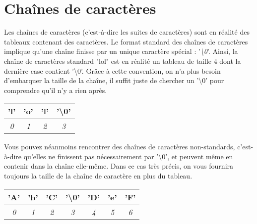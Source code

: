 \documentclass[11pt,a4paper]{article}
\begin{document}
\clearpage


\section{Chaînes de caractères}

Les chaînes de caractères (c'est-à-dire les suites de caractères) sont en réalité des tableaux contenant des caractères.
Le format standard des chaînes de caractères implique qu'une chaîne finisse par un unique caractère spécial : '\textit{\textbackslash 0}'.
Ainsi, la chaîne de caractères standard "lol" est en réalité un tableau de taille $ 4 $ dont la dernière case contient '\textbackslash 0'.
Grâce à cette convention, on n'a plus besoin d'embarquer la taille de la chaîne, il suffit juste de chercher un '\textbackslash 0' pour comprendre qu'il n'y a rien après.

\bigskip

\begin{table}[h!]
  \centering
  \begin{tabular}{| c | c | c | c |}
  \hline
'l' & 'o' & 'l' & '\textbackslash 0' \\
  \hline
\textit{0} & \textit{1} & \textit{2} & \textit{3} \\
  \hline
  \end{tabular}
\end{table}

\bigskip

Vous pouvez néanmoins rencontrer des chaînes de caractères non-standards, c'est-à-dire qu'elles ne finissent pas nécessairement par '\textbackslash 0', et peuvent même en contenir dans la chaîne elle-même.
Dans ce cas très précis, on vous fournira toujours la taille de la chaîne de caractère en plus du tableau.

\bigskip

\begin{table}[h!]
  \centering
  \begin{tabular}{| c | c | c | c | c | c | c |}
  \hline
'A' & 'b' & 'C' & '\textbackslash 0' & 'D' & 'e' & 'F' \\
  \hline
\textit{0} & \textit{1} & \textit{2} & \textit{3} & \textit{4} & \textit{5} & \textit{6} \\
  \hline
  \end{tabular}
\end{table}
\end{document}
